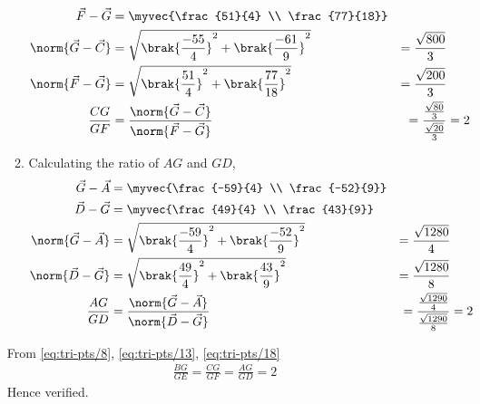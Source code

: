 \documentclass[11pt]{book}
\begin{document}
\begin{enumerate}[label=\thesection.\arabic*.,ref=\thesection.\theenumi]
\begin{enumerate}
\begin{align}
		\label{eq:tri-pts/10} \vec{F}-\vec{G} &= \myvec{\frac{51}{4} \\ \frac{77}{18}} \\
		\label{eq:tri-pts/11} \norm{\vec{G}-\vec{C}} &= \sqrt{\brak{\frac{-55}{4}}^{2} + \brak{\frac{-61}{9}}^{2}} &= \frac{\sqrt{800}}{3} \\  
		\label{eq:tri-pts/12} \norm{\vec{F}-\vec{G}} &= \sqrt{\brak{\frac{51}{4}}^{2} + \brak{\frac{77}{18}}^{2}} &= \frac{\sqrt{200}}{3} \\
		\label{eq:tri-pts/13}\frac{CG}{GF} &= \frac{\norm{\vec{G}-\vec{C}}}{\norm{\vec{F}-\vec{G}}} &= \frac{\frac{\sqrt{80}}{3}}{\frac{\sqrt{20}}{3}} &= 2		
\end{align}
\item Calculating the ratio of $AG$ and $GD$,
\begin{align}
		\label{eq:tri-pts/14} \vec{G}-\vec{A} &= \myvec{\frac{-59}{4} \\ \frac{-52}{9}} \\
		\label{eq:tri-pts/15} \vec{D}-\vec{G} &= \myvec{\frac{49}{4} \\ \frac{43}{9}} \\
		\label{eq:tri-pts/16} \norm{\vec{G}-\vec{A}} &= \sqrt{\brak{\frac{-59}{4}}^{2} + \brak{\frac{-52}{9}}^{2}} &= \frac{\sqrt{1280}}{4} \\
		\label{eq:tri-pts/17} \norm{\vec{D}-\vec{G}} &= \sqrt{\brak{\frac{49}{4}}^{2}+\brak{\frac{43}{9}}^{2}} &= \frac{\sqrt{1280}}{8} \\
		\label{eq:tri-pts/18}\frac{AG}{GD} &= \frac{\norm{\vec{G}-\vec{A}}}{\norm{\vec{D}-\vec{G}}} &= \frac{\frac{\sqrt{1290}}{4}}{\frac{\sqrt{1290}}{8}} &= 2 
\end{align}
\end{enumerate}

From \eqref{eq:tri-pts/8}, \eqref{eq:tri-pts/13}, \eqref{eq:tri-pts/18}
\begin{align}
		\frac{BG}{GE} = 
		\frac{CG}{GF} =
		\frac{AG}{GD} = 2
\end{align}
Hence verified.




\end{enumerate}
\end{document}
